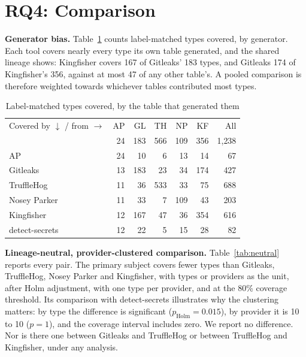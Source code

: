 \documentclass[10pt,journal,compsoc]{IEEEtran}
\begin{document}
\section{RQ4: Comparison}
\label{sec:rq4}

\textbf{Generator bias.} Table~\ref{tab:coverage} counts label-matched types covered, by generator. Each tool covers nearly every type its own table generated, and the shared lineage shows: Kingfisher covers 167 of Gitleaks' 183 types, and Gitleaks 174 of Kingfisher's 356, against at most 47 of any other table's. A pooled comparison is therefore weighted towards whichever tables contributed most types.

\begin{table}[t]
\centering
\caption{Label-matched types covered, by the table that generated them}
\label{tab:coverage}
\footnotesize
\setlength{\tabcolsep}{3pt}
\begin{tabular}{@{}lrrrrrr@{}}
\toprule
Covered by $\downarrow$ / from $\rightarrow$ & AP & GL & TH & NP & KF & All \\
 & 24 & 183 & 566 & 109 & 356 & 1{,}238 \\
\midrule
AP & 24 & 10 & 6 & 13 & 14 & 67 \\
Gitleaks & 13 & 183 & 23 & 34 & 174 & 427 \\
TruffleHog & 11 & 36 & 533 & 33 & 75 & 688 \\
Nosey Parker & 11 & 33 & 7 & 109 & 43 & 203 \\
Kingfisher & 12 & 167 & 47 & 36 & 354 & 616 \\
detect-secrets & 12 & 22 & 5 & 15 & 28 & 82 \\
\bottomrule
\end{tabular}
\end{table}

\textbf{Lineage-neutral, provider-clustered comparison.} Table~\ref{tab:neutral} reports every pair. The primary subject covers fewer types than Gitleaks, TruffleHog, Nosey Parker and Kingfisher, with types or providers as the unit, after Holm adjustment, with one type per provider, and at the 80\% coverage threshold. Its comparison with detect-secrets illustrates why the clustering matters: by type the difference is significant ($p_{\text{Holm}}=0.015$), by provider it is 10 to 10 ($p=1$), and the coverage interval includes zero. We report no difference. Nor is there one between Gitleaks and TruffleHog or between TruffleHog and Kingfisher, under any analysis.
\end{document}
